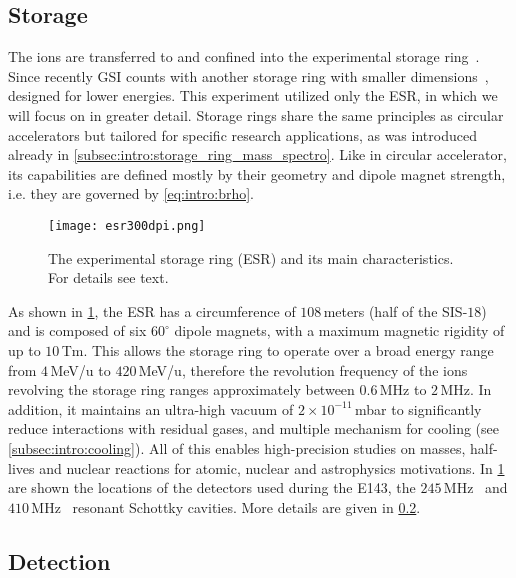 \subsection{Storage}\label{subsec:chap2:storage}
The ions are transferred to and confined into the experimental storage ring~\cite{ESR}. Since recently \textsc{GSI} counts with another storage ring with smaller dimensions~\cite{cryring, cryringGSI}, designed for lower energies.
This experiment utilized only the \textsc{ESR}, in which we will focus on in greater detail. Storage rings share the same principles as circular accelerators but tailored for specific research applications, as was introduced already in \cref{subsec:intro:storage_ring_mass_spectro}. Like in circular accelerator, its capabilities are defined mostly by their geometry and dipole magnet strength, i.e. they are governed by \cref{eq:intro:brho}.
\newpar
\begin{figure}[hbt]
    \centering
    \texttt{[image: esr300dpi.png]}
    \caption{The experimental storage ring (\textsc{ESR}) and its main characteristics. For details see text.}
    \label{fig:chap2:esr}
\end{figure}
As shown in \cref{fig:chap2:esr}, the \textsc{ESR} has a circumference of $108$\,meters (half of the \textsc{SIS}-$18$) and is composed of six $60^\circ$ dipole magnets, with a maximum magnetic rigidity of up to $10$\,Tm. This allows the storage ring to operate over a broad energy range from $4$\,MeV/u to $420$\,MeV/u, therefore the revolution frequency of the ions revolving the storage ring ranges approximately between $0.6$\,MHz to $2$\,MHz. In addition, it maintains an ultra-high vacuum of $2\times10^{-11}$\,mbar to significantly reduce interactions with residual gases, and multiple mechanism for cooling (see \cref{subsec:intro:cooling}). All of this enables high-precision studies on masses, half-lives and nuclear reactions for atomic, nuclear and astrophysics motivations. In \cref{fig:chap2:esr} are shown the locations of the detectors used during the \textsc{E143}, the $245$\,MHz~\cite{Sanjari_2013} and $410$\,MHz~\cite{Sanjari-410} resonant Schottky cavities. More details are given in \cref{subsec:chap2:detection}.

\subsection{Detection}\label{subsec:chap2:detection}

